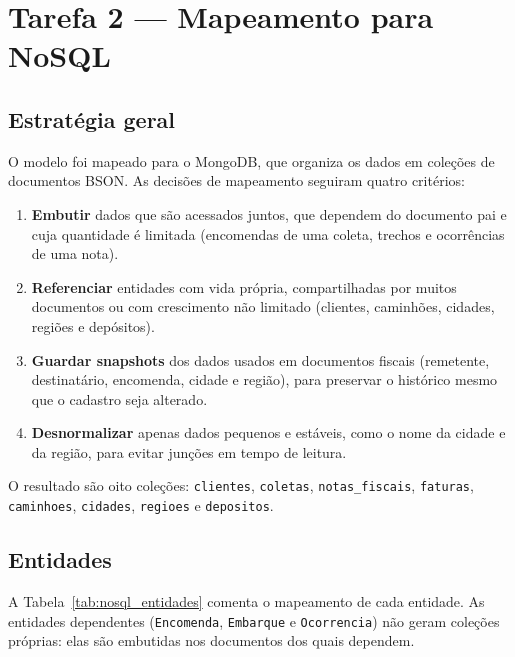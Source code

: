 \section{Tarefa 2 --- Mapeamento para NoSQL}

\subsection{Estratégia geral}

O modelo foi mapeado para o MongoDB, que organiza os dados em coleções de documentos BSON. As decisões de mapeamento seguiram quatro critérios:
\begin{enumerate}
  \item \textbf{Embutir} dados que são acessados juntos, que dependem do documento pai e cuja quantidade é limitada (encomendas de uma coleta, trechos e ocorrências de uma nota).
  \item \textbf{Referenciar} entidades com vida própria, compartilhadas por muitos documentos ou com crescimento não limitado (clientes, caminhões, cidades, regiões e depósitos).
  \item \textbf{Guardar snapshots} dos dados usados em documentos fiscais (remetente, destinatário, encomenda, cidade e região), para preservar o histórico mesmo que o cadastro seja alterado.
  \item \textbf{Desnormalizar} apenas dados pequenos e estáveis, como o nome da cidade e da região, para evitar junções em tempo de leitura.
\end{enumerate}
O resultado são oito coleções: \texttt{clientes}, \texttt{coletas}, \texttt{notas\_fiscais}, \texttt{faturas}, \texttt{caminhoes}, \texttt{cidades}, \texttt{regioes} e \texttt{depositos}.

\subsection{Entidades}

A Tabela~\ref{tab:nosql_entidades} comenta o mapeamento de cada entidade. As entidades dependentes (\texttt{Encomenda}, \texttt{Embarque} e \texttt{Ocorrencia}) não geram coleções próprias: elas são embutidas nos documentos dos quais dependem.


